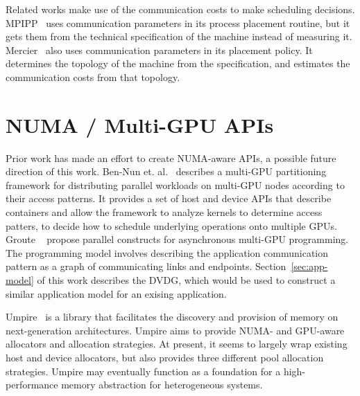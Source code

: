 Related works make use of the communication costs to make scheduling decisions.
MPIPP~\cite{chen2006mpipp} uses communication parameters in its process placement routine, but it gets them from the technical specification of the machine instead of measuring it.
Mercier~\cite{mercier2009towards} also uses communication parameters in its placement policy.
It determines the topology of the machine from the specification, and estimates the communication costs from that topology.

\section{NUMA / Multi-GPU APIs}

Prior work has made an effort to create NUMA-aware APIs, a possible future direction of this work.
Ben-Nun et. al.~\cite{ben2015memory} describes a multi-GPU partitioning framework for distributing parallel workloads on multi-GPU nodes according to their access patterns.
It provides a set of host and device APIs that describe containers and allow the framework to analyze kernels to determine access patters, to decide how to schedule underlying operations onto multiple GPUs.
Groute ~\cite{ben2017groute} propose parallel constructs for asynchronous multi-GPU programming.
The programming model involves describing the application communication pattern as a graph of communicating links and endpoints.
Section~\ref{sec:app-model} of this work describes the DVDG, which would be used to construct a similar application model for an exising application.

Umpire~\cite{beckingsale2018umpire} is a library that facilitates the discovery and provision of memory on next-generation architectures.
Umpire aims to provide NUMA- and GPU-aware allocators and allocation strategies.
At present, it seems to largely wrap existing host and device allocators, but also provides three different pool allocation strategies.
Umpire may eventually function as a foundation for a high-performance memory abstraction for heterogeneous systems.